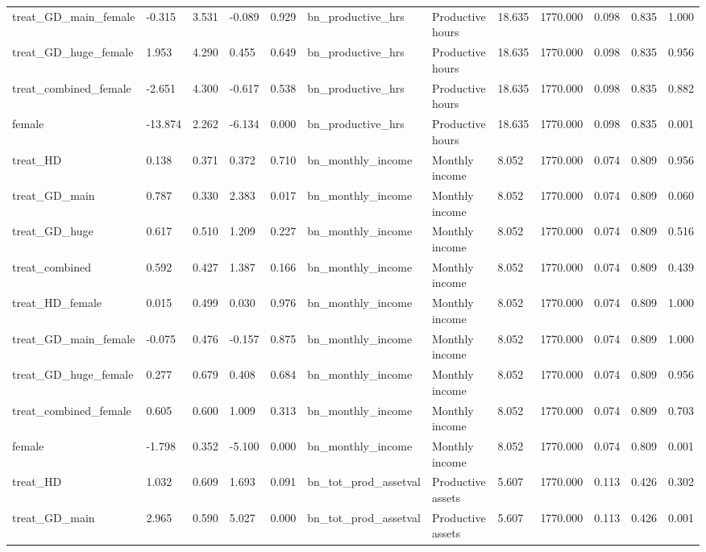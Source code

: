 \begin{tabular}{llllllllllll}
treat\_GD\_main\_female & -0.315 & 3.531 & -0.089 & 0.929 & bn\_productive\_hrs & Productive hours & 18.635 & 1770.000 & 0.098 & 0.835 & 1.000 \\
treat\_GD\_huge\_female & 1.953 & 4.290 & 0.455 & 0.649 & bn\_productive\_hrs & Productive hours & 18.635 & 1770.000 & 0.098 & 0.835 & 0.956 \\
treat\_combined\_female & -2.651 & 4.300 & -0.617 & 0.538 & bn\_productive\_hrs & Productive hours & 18.635 & 1770.000 & 0.098 & 0.835 & 0.882 \\
female & -13.874 & 2.262 & -6.134 & 0.000 & bn\_productive\_hrs & Productive hours & 18.635 & 1770.000 & 0.098 & 0.835 & 0.001 \\
treat\_HD & 0.138 & 0.371 & 0.372 & 0.710 & bn\_monthly\_income & Monthly income & 8.052 & 1770.000 & 0.074 & 0.809 & 0.956 \\
treat\_GD\_main & 0.787 & 0.330 & 2.383 & 0.017 & bn\_monthly\_income & Monthly income & 8.052 & 1770.000 & 0.074 & 0.809 & 0.060 \\
treat\_GD\_huge & 0.617 & 0.510 & 1.209 & 0.227 & bn\_monthly\_income & Monthly income & 8.052 & 1770.000 & 0.074 & 0.809 & 0.516 \\
treat\_combined & 0.592 & 0.427 & 1.387 & 0.166 & bn\_monthly\_income & Monthly income & 8.052 & 1770.000 & 0.074 & 0.809 & 0.439 \\
treat\_HD\_female & 0.015 & 0.499 & 0.030 & 0.976 & bn\_monthly\_income & Monthly income & 8.052 & 1770.000 & 0.074 & 0.809 & 1.000 \\
treat\_GD\_main\_female & -0.075 & 0.476 & -0.157 & 0.875 & bn\_monthly\_income & Monthly income & 8.052 & 1770.000 & 0.074 & 0.809 & 1.000 \\
treat\_GD\_huge\_female & 0.277 & 0.679 & 0.408 & 0.684 & bn\_monthly\_income & Monthly income & 8.052 & 1770.000 & 0.074 & 0.809 & 0.956 \\
treat\_combined\_female & 0.605 & 0.600 & 1.009 & 0.313 & bn\_monthly\_income & Monthly income & 8.052 & 1770.000 & 0.074 & 0.809 & 0.703 \\
female & -1.798 & 0.352 & -5.100 & 0.000 & bn\_monthly\_income & Monthly income & 8.052 & 1770.000 & 0.074 & 0.809 & 0.001 \\
treat\_HD & 1.032 & 0.609 & 1.693 & 0.091 & bn\_tot\_prod\_assetval & Productive assets & 5.607 & 1770.000 & 0.113 & 0.426 & 0.302 \\
treat\_GD\_main & 2.965 & 0.590 & 5.027 & 0.000 & bn\_tot\_prod\_assetval & Productive assets & 5.607 & 1770.000 & 0.113 & 0.426 & 0.001 \\

\end{tabular}
